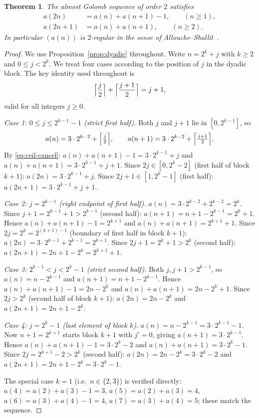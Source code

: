 \documentclass[12pt]{article}
\newtheorem{theorem}{Theorem}[section]
\theoremstyle{definition}
\theoremstyle{remark}
\begin{document}
\begin{theorem}\label{thm:r2}
  The almost Golomb sequence of order $2$ satisfies
  \begin{align}
    a(2n)   &= a(n)+a(n+1)-1, \qquad (n\ge 1), \label{eq:r2even}\\
    a(2n+1) &= a(n)+a(n+1), \qquad (n\ge 2).   \label{eq:r2odd}
  \end{align}
  In particular $(a(n))$ is $2$-regular in the sense of Allouche--Shallit~\cite{AS92}.
\end{theorem}

\begin{proof}
  We use Proposition~\ref{prop:dyadic} throughout. Write $n=2^k+j$ with $k\ge 2$
  and $0\le j<2^k$. We treat four cases according to the position of $j$ in the
  dyadic block. The key identity used throughout is
  \begin{equation}\label{eq:ceil-cancel}
    \Bigl\lceil\frac{j}{2}\Bigr\rceil+\Bigl\lceil\frac{j+1}{2}\Bigr\rceil = j+1,
  \end{equation}
  valid for all integers $j\ge 0$.


  \textit{Case 1: $0\le j\le 2^{k-1}-1$ (strict first half).}
  Both $j$ and $j+1$ lie in $[0,2^{k-1}]$, so
  \[
    a(n)=3\cdot 2^{k-2}+\Bigl\lceil\tfrac{j}{2}\Bigr\rceil,\qquad
    a(n+1)=3\cdot 2^{k-2}+\Bigl\lceil\tfrac{j+1}{2}\Bigr\rceil.
  \]
  By \eqref{eq:ceil-cancel}: $a(n)+a(n+1)-1=3\cdot 2^{k-1}+j$ and
  $a(n)+a(n+1)=3\cdot 2^{k-1}+j+1$.
  Since $2j\in[0,2^k-2]$ (first half of block $k+1$):
  $a(2n)=3\cdot 2^{k-1}+j$. Since $2j+1\in[1,2^k-1]$ (first half):
  $a(2n+1)=3\cdot 2^{k-1}+j+1$.


  \textit{Case 2: $j=2^{k-1}$ (right endpoint of first half).}
  $a(n)=3\cdot 2^{k-2}+2^{k-2}=2^k$. Since $j+1=2^{k-1}+1>2^{k-1}$
  (second half): $a(n+1)=n+1-2^{k-1}=2^k+1$.
  Hence $a(n)+a(n+1)-1=2^{k+1}$ and $a(n)+a(n+1)=2^{k+1}+1$.
  Since $2j=2^k=2^{(k+1)-1}$ (boundary of first half in block $k+1$):
  $a(2n)=3\cdot 2^{k-1}+2^{k-1}=2^{k+1}$.
  Since $2j+1=2^k+1>2^k$ (second half): $a(2n+1)=2n+1-2^k=2^{k+1}+1$.


  \textit{Case 3: $2^{k-1}<j<2^k-1$ (strict second half).}
  Both $j,j+1>2^{k-1}$, so $a(n)=n-2^{k-1}$ and $a(n+1)=n+1-2^{k-1}$.
  Hence $a(n)+a(n+1)-1=2n-2^k$ and $a(n)+a(n+1)=2n-2^k+1$.
  Since $2j>2^k$ (second half of block $k+1$): $a(2n)=2n-2^k$
  and $a(2n+1)=2n+1-2^k$.


  \textit{Case 4: $j=2^k-1$ (last element of block $k$).}
  $a(n)=n-2^{k-1}=3\cdot 2^{k-1}-1$. Now $n+1=2^{k+1}$ starts block $k+1$
  with $j'=0$, giving $a(n+1)=3\cdot 2^{k-1}$.
  Hence $a(n)+a(n+1)-1=3\cdot 2^k-2$ and $a(n)+a(n+1)=3\cdot 2^k-1$.
  Since $2j=2^{k+1}-2>2^k$ (second half): $a(2n)=2n-2^k=3\cdot 2^k-2$
  and $a(2n+1)=2n+1-2^k=3\cdot 2^k-1$.


  The special case $k=1$ (i.e.\ $n\in\{2,3\}$) is verified directly:
  $a(4)=a(2)+a(3)-1=3$, $a(5)=a(2)+a(3)=4$,
  $a(6)=a(3)+a(4)-1=4$, $a(7)=a(3)+a(4)=5$;
  these match the sequence.
\end{proof}
\end{document}
